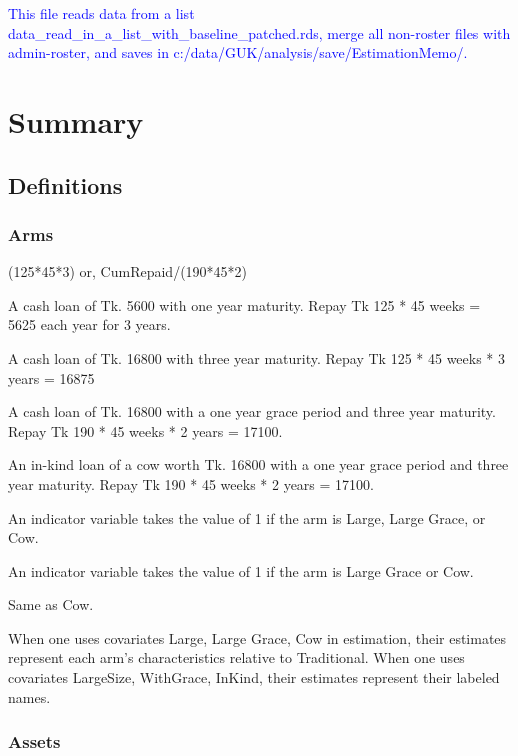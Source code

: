 \textcolor{blue}{This file reads data from a list \textsf{data\_read\_in\_a\_list\_with\_baseline\_patched.rds}, merge all non-roster files with admin-roster, and saves in c:/data/GUK/analysis/save/EstimationMemo/.}




\section{Summary}

\subsection{Definitions}

\subsubsection{Arms}
(125*45*3) or, CumRepaid/(190*45*2)
\begin{description}
\vspace{1.0ex}\setlength{\itemsep}{1.0ex}\setlength{\baselineskip}{12pt}
\item[Traditional]	A cash loan of Tk. 5600 with one year maturity. Repay Tk 125 * 45 weeks = 5625 each year for 3 years.
\item[Large]	A cash loan of Tk. 16800 with three year maturity. Repay Tk 125 * 45 weeks * 3 years = 16875
\item[Large Grace]	A cash loan of Tk. 16800 with a one year grace period and three year maturity. Repay Tk 190 * 45 weeks * 2 years = 17100.
\item[Cow]	An in-kind loan of a cow worth Tk. 16800 with a one year grace period and three year maturity. Repay Tk 190 * 45 weeks * 2 years = 17100.
\item[LargeSize]	An indicator variable takes the value of 1 if the arm is Large, Large Grace, or Cow.
\item[WithGrace]	An indicator variable takes the value of 1 if the arm is Large Grace or Cow.
\item[InKind]	Same as Cow.
\end{description}
When one uses covariates \textsf{Large, Large Grace, Cow} in estimation, their estimates represent each arm's characteristics relative to \textsf{Traditional}. When one uses covariates \textsf{LargeSize, WithGrace, InKind}, their estimates represent their labeled names.

\subsubsection{Assets}


